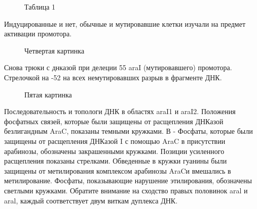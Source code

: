 \begin{figure}[H]\label{ul}
	\caption{Таблица 1}
\end{figure} 
Индуцированные и нет, обычные и мутировавшие клетки изучали на предмет активации промотора.
\begin{figure}[H]\label{ul}
	\caption{Четвертая картинка}
\end{figure} 
Снова трюки с днказой при делеции 55 araI (мутировавшего) промотора. Стрелочкой на -52 на всех немутировавших разрыв в фрагменте ДНК.
\begin{figure}[H]\label{ul}
	\caption{Пятая картинка}
\end{figure}
Последовательность и топологи ДНК в областях araI1 и araI2.
Положения фосфатных связей, которые были защищены от расщепления ДНКазой безлигандным AraC, показаны темными кружками.  
В - Фосфаты, которые были защищены от расщепления ДНКазой I с помощью AraC в присутствии арабинозы, обозначены закрашенными кружками.  Позиции усиленного расщепления показаны стрелками.  Обведенные в кружки гуанины были защищены от метилирования комплексом арабинозы AraCи вмешались в метилирование. Фосфаты, показывающие нарушение этилирования, обозначены светлыми кружками. 
Обратите внимание на сходство правых половинок aral и aral, каждый соответствует двум виткам дуплекса ДНК.